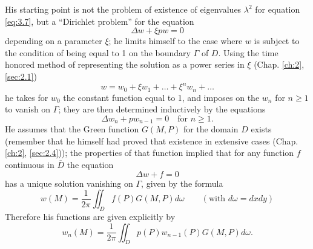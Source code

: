 \documentclass[12pt,a4paper,leqno,twoside]{extbook}
\begin{document}
His starting point is not the problem of existence of eigenvalues \(\lambda^2\) for equation \eqref{eq:3.7}, but a ``Dirichlet problem'' for the equation
\begin{equation}
    \label{eq:3.8}
    \Delta w + \xi pw = 0
\end{equation}
depending on a parameter \(\xi\); he limits himself to the case where \(w\) is subject to the condition of being equal to 1 on the boundary \(\Gamma\) of \(D\). Using the time honored method of representing the solution as a power series in \(\xi\) (Chap. \ref{ch:2}, \ref{sec:2.1})
\begin{equation}
    \label{eq:3.9}
    w = w_0 + \xi w_1 + \ldots + \xi^n w_n + \ldots
\end{equation}
he takes for \(w_0\) the constant function equal to 1, and imposes on the \(w_n\) for \(n \geq 1\) to vanish on \(\Gamma\); they are then determined inductively by the equations
\begin{equation}
    \label{eq:3.10}
    \Delta w_n + pw_{n-1} = 0 \quad \text{for } n \geq 1.
\end{equation}
He assumes that the Green function \(G(M, P)\) for the domain \(D\) exists (remember that he himself had proved that existence in extensive cases (Chap. \ref{ch:2}, \ref{sec:2.4})); the properties of that function implied that for any function \(f\) continuous in \(\overline{D}\) the equation
\begin{equation}
    \label{eq:3.11}
    \Delta w + f = 0
\end{equation}
has a unique solution vanishing on \(\Gamma\), given by the formula
\begin{equation}
    \label{eq:3.12}
    w(M) = \frac{1}{2\pi} \iint_D f(P) G(M, P) d\omega \qquad (\text{with } d\omega = dxdy)
\end{equation}
Therefore his functions are given explicitly by
\begin{equation}
    \label{eq:3.13}
    w_n(M) = \frac{1}{2\pi} \iint_D p(P) w_{n-1}(P) G(M, P) d\omega.
\end{equation}
\end{document}
